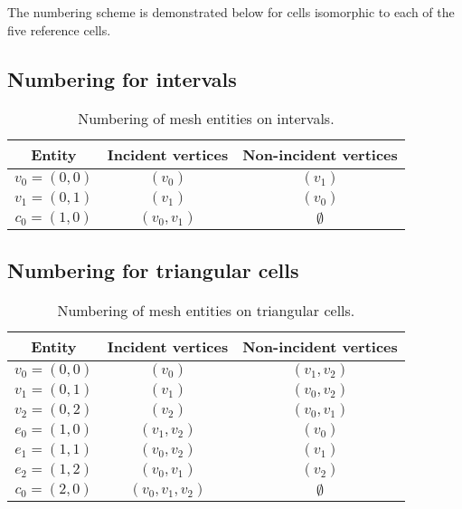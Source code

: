 The numbering scheme is demonstrated below for cells
isomorphic to each of the five reference cells.

\subsection{Numbering for intervals}

\begin{table}[H]
\linespread{1.2}\selectfont
  \begin{center}
    \begin{tabular}{|c|c|c|}
      \hline
      Entity & Incident vertices & Non-incident vertices \\
      \hline
      \hline
      $v_0 = (0, 0)$ & $(v_0)$ & $(v_1)$ \\
      \hline
      $v_1 = (0, 1)$ & $(v_1)$ & $(v_0)$ \\
      \hline
      $c_0 = (1, 0)$ & $(v_0, v_1)$ & $\emptyset$ \\
      \hline
    \end{tabular}
    \caption{Numbering of mesh entities on intervals.}
    \label{tab:interval,entities}
  \end{center}
\end{table}

\subsection{Numbering for triangular cells}

\begin{table}[H]
\linespread{1.2}\selectfont
  \begin{center}
    \begin{tabular}{|c|c|c|}
      \hline
      Entity & Incident vertices & Non-incident vertices \\
      \hline
      \hline
      $v_0 = (0, 0)$ & $(v_0)$ & $(v_1, v_2)$ \\
      \hline
      $v_1 = (0, 1)$ & $(v_1)$ & $(v_0, v_2)$ \\
      \hline
      $v_2 = (0, 2)$ & $(v_2)$ & $(v_0, v_1)$ \\
      \hline
      $e_0 = (1, 0)$ & $(v_1, v_2)$ & $(v_0)$ \\
      \hline
      $e_1 = (1, 1)$ & $(v_0, v_2)$ & $(v_1)$ \\
      \hline
      $e_2 = (1, 2)$ & $(v_0, v_1)$ & $(v_2)$ \\
      \hline
      $c_0 = (2, 0)$ & $(v_0, v_1, v_2)$ & $\emptyset$ \\
      \hline
    \end{tabular}
    \caption{Numbering of mesh entities on triangular cells.}
    \label{tab:triangle,entities}
  \end{center}
\end{table}

